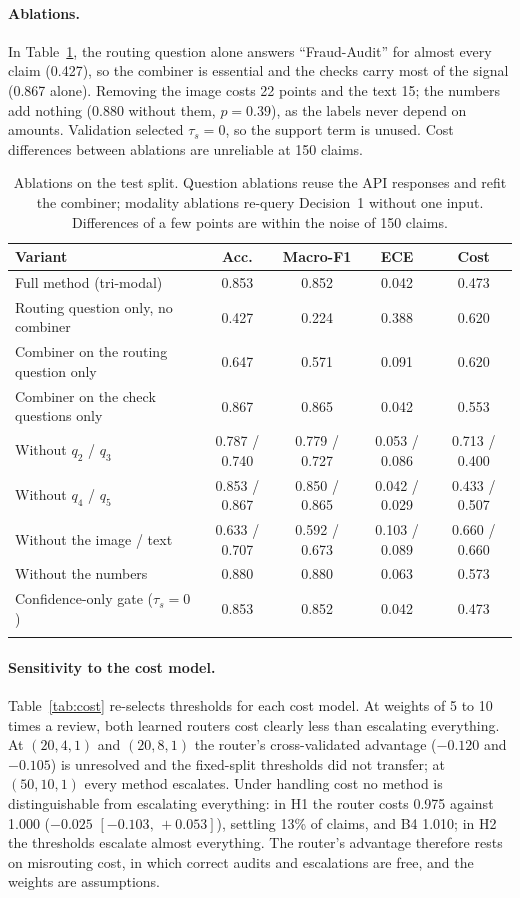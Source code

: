 \paragraph{Ablations.}
In Table~\ref{tab:abl}, the routing question alone answers ``Fraud-Audit'' for almost every claim (0.427), so the combiner is essential and the checks carry most of the signal (0.867 alone). Removing the image costs 22 points and the text 15; the numbers add nothing (0.880 without them, $p=0.39$), as the labels never depend on amounts. Validation selected $\tau_s=0$, so the support term is unused. Cost differences between ablations are unreliable at 150 claims.

\begin{table}[!htb]
\caption{Ablations on the test split. Question ablations reuse the API responses and refit the combiner; modality ablations re-query Decision~1 without one input. Differences of a few points are within the noise of 150 claims.}\label{tab:abl}
\footnotesize
\begin{tabular*}{\textwidth}{@{\extracolsep{\fill}}lcccc@{}}
\toprule
Variant & Acc. & Macro-F1 & ECE & Cost \\
\midrule
Full method (tri-modal) & 0.853 & 0.852 & 0.042 & 0.473 \\
Routing question only, no combiner & 0.427 & 0.224 & 0.388 & 0.620 \\
Combiner on the routing question only & 0.647 & 0.571 & 0.091 & 0.620 \\
Combiner on the check questions only & 0.867 & 0.865 & 0.042 & 0.553 \\
Without $q_2$ / $q_3$ & 0.787 / 0.740 & 0.779 / 0.727 & 0.053 / 0.086 & 0.713 / 0.400 \\
Without $q_4$ / $q_5$ & 0.853 / 0.867 & 0.850 / 0.865 & 0.042 / 0.029 & 0.433 / 0.507 \\
Without the image / text & 0.633 / 0.707 & 0.592 / 0.673 & 0.103 / 0.089 & 0.660 / 0.660 \\
Without the numbers & 0.880 & 0.880 & 0.063 & 0.573 \\
Confidence-only gate ($\tau_s=0$) & 0.853 & 0.852 & 0.042 & 0.473 \\
\botrule
\end{tabular*}
\end{table}

\paragraph{Sensitivity to the cost model.}
Table~\ref{tab:cost} re-selects thresholds for each cost model. At weights of 5 to 10 times a review, both learned routers cost clearly less than escalating everything. At $(20,4,1)$ and $(20,8,1)$ the router's cross-validated advantage ($-0.120$ and $-0.105$) is unresolved and the fixed-split thresholds did not transfer; at $(50,10,1)$ every method escalates. Under handling cost no method is distinguishable from escalating everything: in H1 the router costs 0.975 against 1.000 ($-0.025$ $[-0.103,\,+0.053]$), settling 13\% of claims, and B4 1.010; in H2 the thresholds escalate almost everything. The router's advantage therefore rests on misrouting cost, in which correct audits and escalations are free, and the weights are assumptions.

